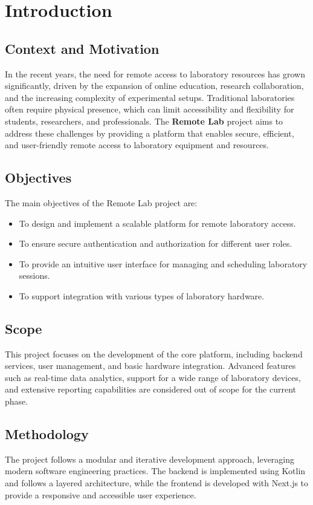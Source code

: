 %
%
\chapter{Introduction} \label{cap:intro}

%
%
\section{Context and Motivation} \label{sec11}
In the recent years, the need for remote access to laboratory resources has grown significantly, driven by the expansion of online education, research collaboration, and the increasing complexity of experimental setups. Traditional laboratories often require physical presence, which can limit accessibility and flexibility for students, researchers, and professionals. The \textbf{Remote Lab} project aims to address these challenges by providing a platform that enables secure, efficient, and user-friendly remote access to laboratory equipment and resources.

%
%
\section{Objectives} \label{sec12}
The main objectives of the Remote Lab project are:
\begin{itemize}
    \item To design and implement a scalable platform for remote laboratory access.
    \item To ensure secure authentication and authorization for different user roles.
    \item To provide an intuitive user interface for managing and scheduling laboratory sessions.
    \item To support integration with various types of laboratory hardware.
\end{itemize}

%
%
\section{Scope} \label{sec13}
This project focuses on the development of the core platform, including backend services, user management, and basic hardware integration. Advanced features such as real-time data analytics, support for a wide range of laboratory devices, and extensive reporting capabilities are considered out of scope for the current phase.

%
%
\section{Methodology} \label{sec14}
The project follows a modular and iterative development approach, leveraging modern software engineering practices. The backend is implemented using Kotlin and follows a layered architecture, while the frontend is developed with Next.js to provide a responsive and accessible user experience.

